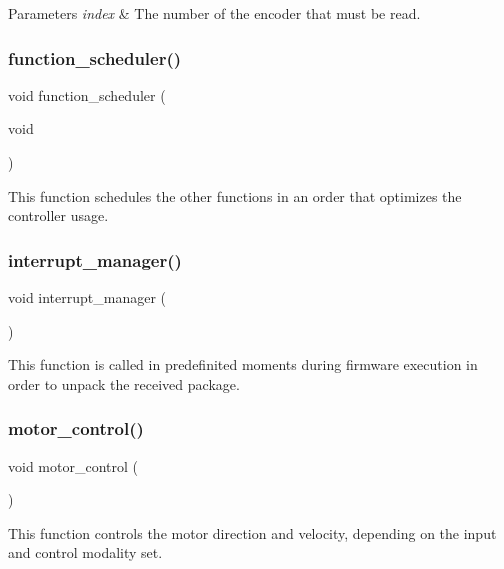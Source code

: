 \begin{DoxyParams}{Parameters}
{\em index} & The number of the encoder that must be read. \\
\hline
\end{DoxyParams}
\mbox{\label{interruptions_8h_a39df971c4e9f194be50c54dfd7aeabfe}} 
\subsubsection{function\+\_\+scheduler()}
{\footnotesize\ttfamily void function\+\_\+scheduler (\begin{DoxyParamCaption}\item[{void}]{ }\end{DoxyParamCaption})}

This function schedules the other functions in an order that optimizes the controller usage. \mbox{\label{interruptions_8h_a9790811526002d99b25a814afd02cbae}} 
\subsubsection{interrupt\+\_\+manager()}
{\footnotesize\ttfamily void interrupt\+\_\+manager (\begin{DoxyParamCaption}{ }\end{DoxyParamCaption})}

This function is called in predefinited moments during firmware execution in order to unpack the received package. \mbox{\label{interruptions_8h_a8c7c487a5a127331b0de53443e3ca964}} 
\subsubsection{motor\+\_\+control()}
{\footnotesize\ttfamily void motor\+\_\+control (\begin{DoxyParamCaption}{ }\end{DoxyParamCaption})}

This function controls the motor direction and velocity, depending on the input and control modality set. \mbox{\label{interruptions_8h_a4e92908805632dc8cab2936d89bb3ba1}} 

